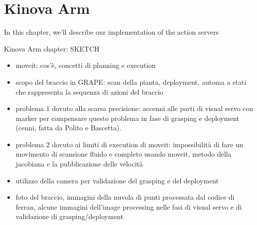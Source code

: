 
\chapter{Kinova Arm} \label{chap:kinovaArmChapter}

In this chapter, we'll describe our implementation of the action servers 

Kinova Arm chapter: SKETCH
\begin{itemize}
	\item moveit: cos'è, concetti di planning e execution
	\item scopo del braccio in GRAPE: scan della pianta, deployment, automa a stati che rappresenta la sequenza di azioni del braccio 
	\item problema 1 dovuto alla scarsa precisione: accenni alle parti di visual servo con marker per compensare questo problema in fase di grasping e deployment (cenni, fatta da Polito e Bascetta).
	\item problema 2 dovuto ai limiti di execution di moveit: impossibilità di fare un movimento di scansione fluido e completo usando moveit, metodo della jacobiana e la pubblicazione delle velocità
	\item utilizzo della camera per validazione del grasping e del deployment
	\item foto del braccio, immagini della nuvola di punti processata dal codice di ferran, alcune immagini dell'image processing nelle fasi di visual servo e di validazione di grasping/deployment
\end{itemize}
